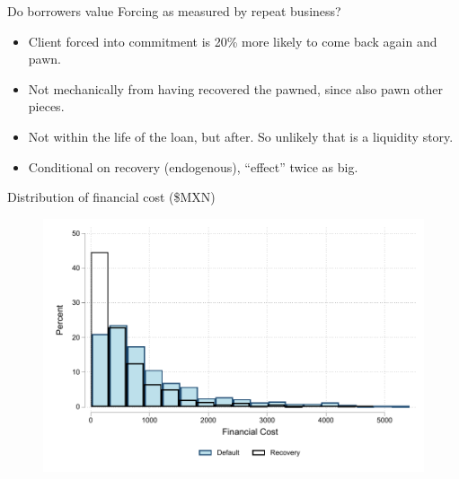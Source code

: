\documentclass[8pt]{beamer}
\begin{document}
\begin{frame}{Do borrowers value Forcing as measured by repeat business?}


\vspace{.2in}
\begin{table}[H]
\begin{center}
\footnotesize{}
\end{center}
\end{table}    
\begin{itemize}
    \item Client forced into commitment is 20\% more likely to come back again and pawn.
    \item Not mechanically from having recovered the pawned, since also pawn other pieces.
    \item Not within the life of the loan, but after. So unlikely that is a liquidity story.
    \item Conditional on recovery (endogenous), ``effect'' twice as big.
\end{itemize}

\end{frame}




\begin{frame}{Distribution of financial cost (\$MXN)}
    \begin{figure}
     \centering
        \includegraphics[width=.8\textwidth]{Figuras/hist_fc.pdf}
    \end{figure}
    
    \hyperlink{fc_outcome}{}

\end{frame}
\end{document}
